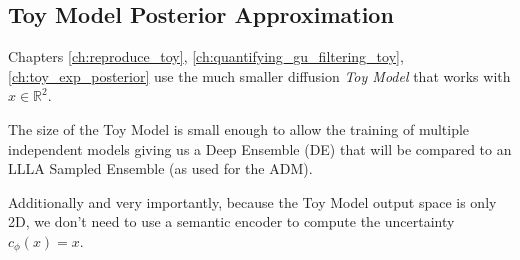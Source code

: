 \subsection{Toy Model Posterior Approximation}
\label{sub:gu_th_toy_model_posterior_approximation}

Chapters \ref{ch:reproduce_toy}, \ref{ch:quantifying_gu_filtering_toy}, \ref{ch:toy_exp_posterior} use the much smaller diffusion \textit{Toy Model} that works with $x \in \mathbb{R}^2$. 

The size of the Toy Model is small enough to allow the training of multiple independent models giving us a Deep Ensemble (\acs{DE}) that will be compared to an \acs{LLLA} Sampled Ensemble (as used for the \acs{ADM}).

Additionally and very importantly, because the Toy Model output space is only 2D, we don't need to use a semantic encoder to compute the uncertainty $c_\phi(x)=x$. 


